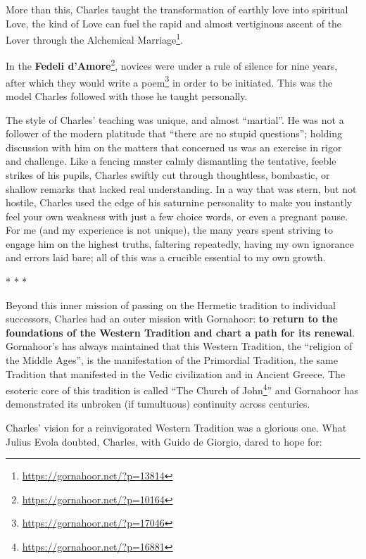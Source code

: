 More than this, Charles taught the transformation of earthly love into spiritual Love, the kind of Love can fuel the rapid and almost vertiginous ascent of the Lover through the Alchemical Marriage\footnote{\url{https://gornahoor.net/?p=13814}}.

In the \textbf{Fedeli d'Amore}\footnote{\url{https://gornahoor.net/?p=10164}}, novices were under a rule of silence for nine years, after which they would write a poem\footnote{\url{https://gornahoor.net/?p=17046}} in order to be initiated. This was the model Charles followed with those he taught personally.

The style of Charles' teaching was unique, and almost ``martial''. He was not a follower of the modern platitude that ``there are no stupid questions''; holding discussion with him on the matters that concerned us was an exercise in rigor and challenge. Like a fencing master calmly dismantling the tentative, feeble strikes of his pupils, Charles swiftly cut through thoughtless, bombastic, or shallow remarks that lacked real understanding. In a way that was stern, but not hostile, Charles used the edge of his saturnine personality to make you instantly feel your own weakness with just a few choice words, or even a pregnant pause. For me (and my experience is not unique), the many years spent striving to engage him on the highest truths, faltering repeatedly, having my own ignorance and errors laid bare; all of this was a crucible essential to my own growth.

\begin{center}* * *\end{center}

Beyond this inner mission of passing on the Hermetic tradition to individual successors, Charles had an outer mission with Gornahoor: \textbf{to return to the foundations of the Western Tradition and chart a path for its renewal}. Gornahoor's has always maintained that this Western Tradition, the ``religion of the Middle Ages'', is the manifestation of the Primordial Tradition, the same Tradition that manifested in the Vedic civilization and in Ancient Greece. The esoteric core of this tradition is called ``The Church of John\footnote{\url{https://gornahoor.net/?p=16881}}'' and Gornahoor has demonstrated its unbroken (if tumultuous) continuity across centuries.

Charles' vision for a reinvigorated Western Tradition was a glorious one. What Julius Evola doubted, Charles, with Guido de Giorgio, dared to hope for:

